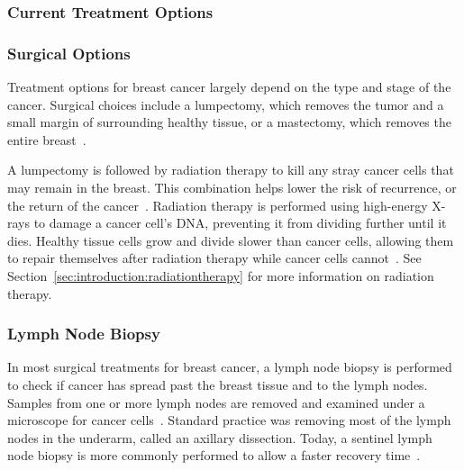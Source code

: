 \subsubsection{Current Treatment Options\label{sec:introduction:breastcancer:currenttreatmentoptions}}

\subsubsection*{Surgical Options\label{sec:introduction:breastcancer:currenttreatmentoptions:surgicaloptions}}

Treatment options for breast cancer largely depend on the type and stage of the cancer. Surgical choices include a lumpectomy, which removes the tumor and a small margin of surrounding healthy tissue, or a mastectomy, which removes the entire breast~\cite{RefWorks:RefID:165-czajka2023breast}.

A lumpectomy is followed by radiation therapy to kill any stray cancer cells that may remain in the breast. This combination helps lower the risk of recurrence, or the return of the cancer~\cite{RefWorks:RefID:159-depolo2024radiation}. Radiation therapy is performed using high-energy X-rays to damage a cancer cell's DNA, preventing it from dividing further until it dies. Healthy tissue cells grow and divide slower than cancer cells, allowing them to repair themselves after radiation therapy while cancer cells cannot~\cite{RefWorks:RefID:159-depolo2024radiation}. See Section~\ref{sec:introduction:radiationtherapy} for more information on radiation therapy.

\subsubsection*{Lymph Node Biopsy\label{sec:introduction:breastcancer:currenttreatmentoptions:lymphnodebiopsy}}
In most surgical treatments for breast cancer, a lymph node biopsy is performed to check if cancer has spread past the breast tissue and to the lymph nodes. Samples from one or more lymph nodes are removed and examined under a microscope for cancer cells~\cite{RefWorks:RefID:37-memorialsurgery}. Standard practice was removing most of the lymph nodes in the underarm, called an axillary dissection. Today, a sentinel lymph node biopsy is more commonly performed to allow a faster recovery time~\cite{RefWorks:RefID:37-memorialsurgery}.

